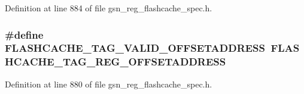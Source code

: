Definition at line 884 of file gsn\_\-reg\_\-flashcache\_\-spec.h.

\hypertarget{a00550_a88581a06a74b96a3237a702ac6589937}{
\subsubsection[{FLASHCACHE\_\-TAG\_\-VALID\_\-OFFSETADDRESS}]{\setlength{\rightskip}{0pt plus 5cm}\#define FLASHCACHE\_\-TAG\_\-VALID\_\-OFFSETADDRESS~FLASHCACHE\_\-TAG\_\-REG\_\-OFFSETADDRESS}}
\label{a00550_a88581a06a74b96a3237a702ac6589937}


Definition at line 880 of file gsn\_\-reg\_\-flashcache\_\-spec.h.

